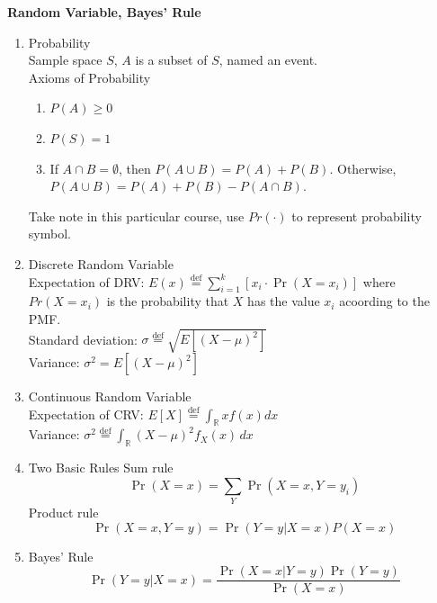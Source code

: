 \textbf{Random Variable, Bayes' Rule}
\begin{enumerate}
    \item Probability \\
    Sample space $S$, $A$ is a subset of $S$, named an event. \\
    Axioms of Probability
    \begin{enumerate}
        \item $P(A) \geq 0$
        \item $P(S) = 1$
        \item If $A \cap B = \emptyset$, then $P(A \cup B) = P(A) + P(B)$. Otherwise, $P(A \cup B) = P(A) + P(B) - P(A \cap B)$.
    \end{enumerate} 
    Take note in this particular course, use $Pr(\cdot)$ to represent probability symbol.
    \item Discrete Random Variable \\
    Expectation of DRV: \(E(x) \overset{\text{def}}{=} \sum_{i=1}^{k} [x_i \cdot \Pr(X = x_i)]\)
    where $Pr(X = x_i)$ is the probability that $X$ has the value $x_i$ acoording to the PMF.\\
    Standard deviation: \(\sigma \overset{\text{def}}{=} \sqrt{E\left[(X - \mu)^2\right]}\) \\
    Variance: \(\sigma^2 = E\left[(X - \mu)^2\right]\) \\
    \item Continuous Random Variable \\
    Expectation of CRV: \(E[X] \overset{\text{def}}{=} \int_{\mathbb{R}} xf(x)dx\) \\
    Variance: \(\sigma^2 \overset{\text{def}}{=} \int_{\mathbb{R}} (X - \mu)^2 f_X(x) \, dx\) \\
    \item Two Basic Rules
    Sum rule
    \[\Pr(X = x) = \sum_{Y} \Pr(X = x, Y = y_i)\]
    Product rule
    \[\Pr(X = x, Y = y) = \Pr(Y = y | X = x) P(X = x)\]
    \item Bayes' Rule
    \[\Pr(Y = y | X = x) = \frac{\Pr(X = x | Y = y) \Pr(Y = y)}{\Pr(X = x)}\]
\end{enumerate}
